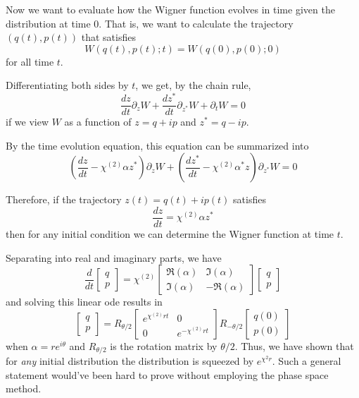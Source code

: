 \documentclass[10pt,a4paper]{report}
\begin{document}
Now we want to evaluate how the Wigner function evolves in time given the distribution at time $0$.
That is, we want to calculate the trajectory $(q(t), p(t))$ that satisfies
\[W(q(t),p(t);t)=W(q(0),p(0);0)\]
for all time $t$.

Differentiating both sides by $t$, we get, by the chain rule,
\[\frac{dz}{dt}\partial_{z}W+\frac{dz^{*}}{dt}\partial_{z^{*}}W+\partial_{t}W=0\]
if we view $W$ as a function of $z=q+ip$ and $z^{*}=q-ip$.

By the time evolution equation, this equation can be summarized into
\[\left(\frac{dz}{dt}-\chi^{(2)}\alpha z^{*}\right)\partial_{z}W+\left(\frac{dz^{*}}{dt}-\chi^{(2)}\alpha^{*} z\right)\partial_{z^{*}}W=0\]

Therefore, if the trajectory $z(t)=q(t)+ip(t)$ satisfies
\[\frac{dz}{dt}=\chi^{(2)}\alpha z^{*}\]
then for any initial condition we can determine the Wigner function at time $t$.

Separating into real and imaginary parts, we have
\[
  \frac{d}{dt}
  \begin{bmatrix}
    q \\
    p
  \end{bmatrix}
  = \chi^{(2)}
  \begin{bmatrix}
    \Re(\alpha) & \Im(\alpha)  \\
    \Im(\alpha) & -\Re(\alpha)
  \end{bmatrix}
  \begin{bmatrix}
    q \\
    p
  \end{bmatrix}
\]
and solving this linear ode results in
\begin{equation}
  \begin{bmatrix}
    q \\
    p
  \end{bmatrix}
  =
  R_{\theta/2}
  \begin{bmatrix}
    e^{\chi^{(2)}rt} & 0                 \\
    0                & e^{-\chi^{(2)}rt}
  \end{bmatrix}
  R_{-\theta/2}
  \begin{bmatrix}
    q(0) \\
    p(0)
  \end{bmatrix}
\end{equation}
when $\alpha=re^{i\theta}$ and $R_{\theta/2}$ is the rotation matrix by $\theta/2$.
Thus, we have shown that for \textit{any} initial distribution the distribution is squeezed by
$e^{\chi^{2}r}$. Such a general statement would've been hard to prove without employing the phase space method.
\end{document}
